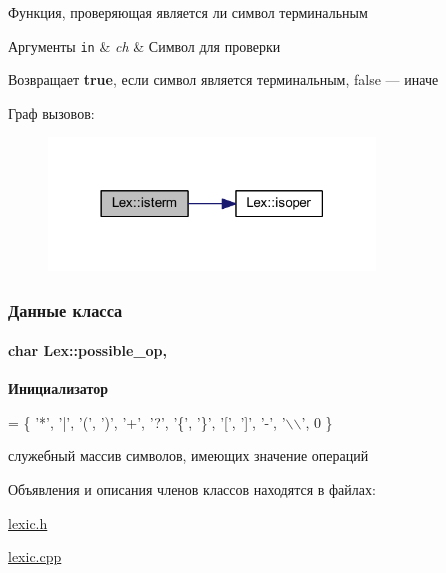 Функция, проверяющая является ли символ терминальным 


\begin{DoxyParams}[1]{Аргументы}
\mbox{\tt in}  & {\em ch} & Символ для проверки \\
\hline
\end{DoxyParams}
\begin{DoxyReturn}{Возвращает}
{\bfseries true}, если символ является терминальным, false — иначе 
\end{DoxyReturn}


Граф вызовов\+:
\nopagebreak
\begin{figure}[H]
\begin{center}
\leavevmode
\includegraphics[width=246pt]{class_lex_a8649a6722fbdc0eb2b331901e959e2d6_cgraph}
\end{center}
\end{figure}




\subsubsection{Данные класса}
\hypertarget{class_lex_ad87b6f7104bb60dee3cf0c196b5b46cd}{}
\paragraph[{possible\+\_\+op}]{\setlength{\rightskip}{0pt plus 5cm}char Lex\+::possible\+\_\+op\hspace{0.3cm}{\ttfamily [static]}, {\ttfamily [private]}}\label{class_lex_ad87b6f7104bb60dee3cf0c196b5b46cd}
{\bfseries Инициализатор}
\begin{DoxyCode}
=
\{
    \textcolor{charliteral}{'*'},
    \textcolor{charliteral}{'|'},
    \textcolor{charliteral}{'('},
    \textcolor{charliteral}{')'},
    \textcolor{charliteral}{'+'},
    \textcolor{charliteral}{'?'},
    \textcolor{charliteral}{'\{'},
    \textcolor{charliteral}{'\}'},
    \textcolor{charliteral}{'['},
    \textcolor{charliteral}{']'},
    \textcolor{charliteral}{'-'},
    \textcolor{charliteral}{'\(\backslash\)\(\backslash\)'},
    0
\}
\end{DoxyCode}


служебный массив символов, имеющих значение операций 



Объявления и описания членов классов находятся в файлах\+:\begin{DoxyCompactItemize}
\item 
\hyperlink{lexic_8h}{lexic.\+h}\item 
\hyperlink{lexic_8cpp}{lexic.\+cpp}\end{DoxyCompactItemize}
